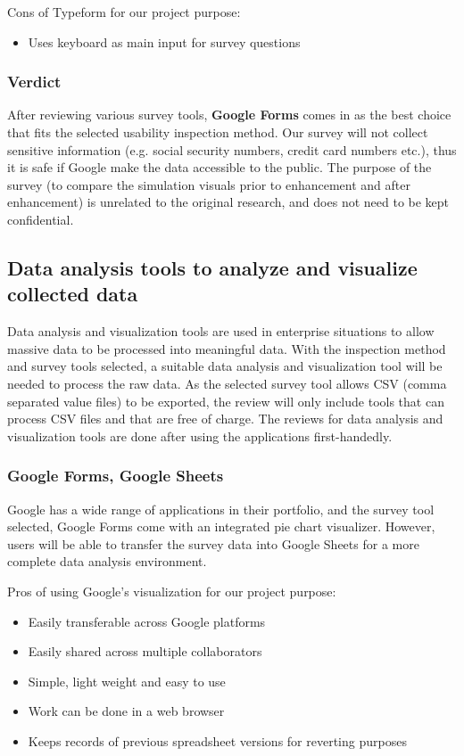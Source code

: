 \documentclass[10pt,journal,compsoc,draftclsnofoot]{IEEEtran}
\begin{document}
Cons of Typeform for our project purpose:
\begin{itemize}
\item Uses keyboard as main input for survey questions
\end{itemize}

\subsubsection{Verdict}
After reviewing various survey tools, \textbf{Google Forms} comes in as the best choice that fits the selected usability inspection method.
Our survey will not collect sensitive information (e.g. social security numbers, credit card numbers etc.), thus it is safe if Google make the data accessible to the public.
The purpose of the survey (to compare the simulation visuals prior to enhancement and after enhancement) is unrelated to the original research, and does not need to be kept confidential.

\newpage

\subsection{Data analysis tools to analyze and visualize collected data}
Data analysis and visualization tools are used in enterprise situations to allow massive data to be processed into meaningful data.
With the inspection method and survey tools selected, a suitable data analysis and visualization tool will be needed to process the raw data.
As the selected survey tool allows CSV (comma separated value files) to be exported, the review will only include tools that can process CSV files and that are free of charge.
The reviews for data analysis and visualization tools are done after using the applications first-handedly. 

\subsubsection{Google Forms, Google Sheets}
Google has a wide range of applications in their portfolio, and the survey tool selected, Google Forms come with an integrated pie chart visualizer.
However, users will be able to transfer the survey data into Google Sheets for a more complete data analysis environment.

Pros of using Google's visualization for our project purpose:
\begin{itemize}
\item Easily transferable across Google platforms
\item Easily shared across multiple collaborators
\item Simple, light weight and easy to use
\item Work can be done in a web browser
\item Keeps records of previous spreadsheet versions for reverting purposes
\end{itemize}
\end{document}

